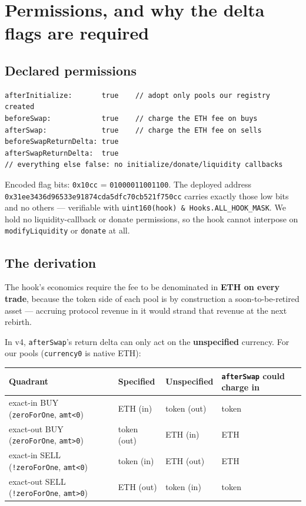 \documentclass[11pt,a4paper]{article}
\newcommand{\code}[1]{\texttt{\small #1}}
\begin{document}
\section{Permissions, and why the delta flags are required}
\label{sec:why}

\subsection{Declared permissions}

\begin{lstlisting}
afterInitialize:       true    // adopt only pools our registry created
beforeSwap:            true    // charge the ETH fee on buys
afterSwap:             true    // charge the ETH fee on sells
beforeSwapReturnDelta: true
afterSwapReturnDelta:  true
// everything else false: no initialize/donate/liquidity callbacks
\end{lstlisting}

\noindent Encoded flag bits: \code{0x10cc} = \code{01000011001100}. The deployed
address \code{0x31ee3436d96533e91874cda5dfc70cb521f750cc} carries exactly those
low bits and no others --- verifiable with
\code{uint160(hook) \& Hooks.ALL\_HOOK\_MASK}. We hold no liquidity-callback or
donate permissions, so the hook cannot interpose on \code{modifyLiquidity} or
\code{donate} at all.

\subsection{The derivation}

The hook's economics require the fee to be denominated in \textbf{ETH on every
trade}, because the token side of each pool is by construction a
soon-to-be-retired asset --- accruing protocol revenue in it would strand that
revenue at the next rebirth.

In v4, \code{afterSwap}'s return delta can only act on the \textbf{unspecified}
currency. For our pools (\code{currency0} is native ETH):

\begin{center}\small
\begin{tabular}{@{}llll@{}}
\toprule
\textbf{Quadrant} & \textbf{Specified} & \textbf{Unspecified} & \textbf{\code{afterSwap} could charge in} \\
\midrule
\rowcolor{panel} exact-in BUY \, (\code{zeroForOne}, \code{amt<0}) & ETH (in) & token (out) & \textcolor{bad}{token} \\
exact-out BUY (\code{zeroForOne}, \code{amt>0}) & token (out) & ETH (in) & \textcolor{good}{ETH} \\
exact-in SELL (\code{!zeroForOne}, \code{amt<0}) & token (in) & ETH (out) & \textcolor{good}{ETH} \\
\rowcolor{panel} exact-out SELL (\code{!zeroForOne}, \code{amt>0}) & ETH (out) & token (in) & \textcolor{bad}{token} \\
\bottomrule
\end{tabular}
\end{center}
\end{document}
